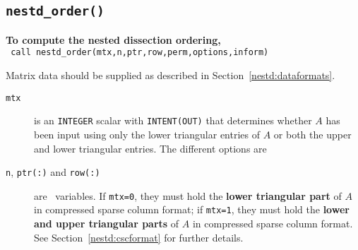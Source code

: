 
\subsection{{\tt nestd\_order()}}

{\bf To compute the nested dissection ordering,}
   \vspace*{0.3cm} \\
\texttt{\hspace*{0.2cm} call nestd\_order(mtx,n,ptr,row,perm,options,inform)}
\vspace{0.3em}

\noindent
Matrix data should be supplied as described in Section~\ref{nestd:dataformats}. 

\noindent
\begin{description}

\item[\texttt{mtx}] is an {\tt INTEGER} scalar with {\tt INTENT(OUT)} that 
determines whether $A$ has been input using only the lower triangular entries 
of $A$ or both the upper and lower triangular entries. The different options are 

\item[\texttt{n}, \texttt{ptr(:)} and \texttt{row(:)}] are \intentin\ variables. 
If {\tt mtx=0}, they must hold the \textbf{lower triangular part} of 
$A$ in compressed sparse column format;  if {\tt mtx=1}, they 
must hold the \textbf{lower and upper triangular parts} of $A$ in compressed sparse 
column format. See Section~\ref{nestd:cscformat} for further details.





\end{description}
